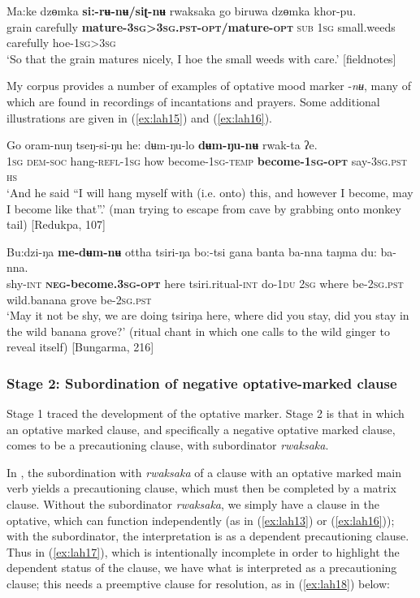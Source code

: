 \documentclass[output=paper,colorlinks,citecolor=brown]{langscibook}
\begin{document}
\ea \label{ex:lah14}
\gll Ma:ke dzɵmka \textbf{si:-rʉ-nʉ/siʈ-nʉ} rwaksaka go biruwa dzɵmka khor-pu. \\
grain carefully \textbf{mature-\textsc{3sg>3sg.pst-opt}/mature-\textsc{opt}} \textsc{sub} \textsc{1sg} small.weeds carefully hoe-\textsc{1sg>3sg} \\
\glt `So that the grain matures nicely, I hoe the small weeds with care.' [fieldnotes]
\z

My  corpus provides a number of examples of optative mood marker \nobreakdash-\textit{nʉ}, many of which are found in recordings of incantations and prayers. Some additional illustrations are given in (\ref{ex:lah15}) and (\ref{ex:lah16}).


\ea \label{ex:lah15}
\gll Go oram-nuŋ tseŋ-si-ŋu  he: dʉm-ŋu-lo \textbf{dʉm-ŋu-nʉ} rwak-ta ʔe. \\
\textsc{1sg} \textsc{dem-soc} hang-\textsc{refl-1sg} how become-\textsc{1sg-temp} \textbf{become-\textsc{1sg-opt}} say\textsc{-3sg.pst} \textsc{hs} \\
\glt `And he said ``I will hang myself with (i.e. onto) this, and however I become, may I become like that''.' (man trying to escape from cave by grabbing onto monkey tail) [Redukpa, 107]
\z


\ea \label{ex:lah16}
\gll Bu:dzi-ŋa \textbf{me-dʉm-nʉ}  ottha tsiri-ŋa bo:-tsi gana banta ba-nna taŋma du: ba-nna. \\
shy-\textsc{int} \textbf{\textsc{neg-}become.3\textsc{sg-opt}} here tsiri.ritual-\textsc{int} do-\textsc{1du} \textsc{2sg} where be-\textsc{2sg.pst} wild.banana grove be-\textsc{2sg.pst} \\
\glt `May it not be shy, we are doing tsiriŋa here, where did you stay, did you stay in the wild banana grove?' (ritual chant in which one calls to the wild ginger to reveal itself) [Bungarma, 216]
\z


\subsubsection{Stage 2: Subordination of negative optative-marked clause}
\label{subsubsec:stage2}

Stage 1 traced the development of the optative marker. Stage 2 is that in which an optative marked clause, and specifically a negative optative marked clause, comes to be a precautioning clause, with subordinator \textit{rwaksaka}. 


In , the subordination with \textit{rwaksaka} of a clause with an optative marked main verb yields a precautioning clause, which must then be completed by a matrix clause. Without the subordinator \textit{rwaksaka}, we simply have a clause in the optative, which can function independently (as in (\ref{ex:lah13}) or (\ref{ex:lah16})); with the subordinator, the interpretation is as a dependent precautioning clause. Thus in (\ref{ex:lah17}), which is intentionally incomplete in order to highlight the dependent status of the clause, we have what is interpreted as a precautioning clause; this needs a preemptive clause for resolution, as in (\ref{ex:lah18}) below: 
\end{document}

